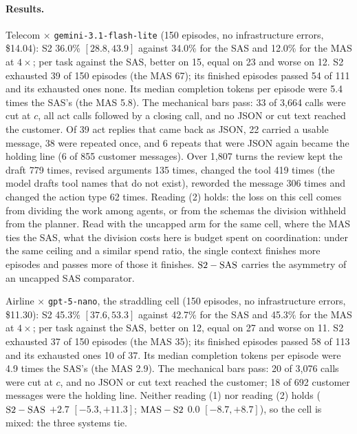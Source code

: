 \paragraph{Results.} Telecom $\times$ \texttt{gemini-3.1-flash-lite} (150 episodes, no infrastructure errors, \$14.04): S2 36.0\% $[28.8, 43.9]$ against 34.0\% for the SAS and 12.0\% for the MAS at $4\times$; per task against the SAS, better on 15, equal on 23 and worse on 12. S2 exhausted 39 of 150 episodes (the MAS 67); its finished episodes passed 54 of 111 and its exhausted ones none. Its median completion tokens per episode were 5.4 times the SAS's (the MAS 5.8). The mechanical bars pass: 33 of 3,664 calls were cut at $c$, all act calls followed by a closing call, and no JSON or cut text reached the customer. Of 39 act replies that came back as JSON, 22 carried a usable message, 38 were repeated once, and 6 repeats that were JSON again became the holding line (6 of 855 customer messages). Over 1,807 turns the review kept the draft 779 times, revised arguments 135 times, changed the tool 419 times (the model drafts tool names that do not exist), reworded the message 306 times and changed the action type 62 times. Reading (2) holds: the loss on this cell comes from dividing the work among agents, or from the schemas the division withheld from the planner. Read with the uncapped arm for the same cell, where the MAS ties the SAS, what the division costs here is budget spent on coordination: under the same ceiling and a similar spend ratio, the single context finishes more episodes and passes more of those it finishes. $\text{S2}-\text{\textup{SAS}}$ carries the asymmetry of an uncapped SAS comparator.

Airline $\times$ \texttt{gpt-5-nano}, the straddling cell (150 episodes, no infrastructure errors, \$11.30): S2 45.3\% $[37.6, 53.3]$ against 42.7\% for the SAS and 45.3\% for the MAS at $4\times$; per task against the SAS, better on 12, equal on 27 and worse on 11. S2 exhausted 37 of 150 episodes (the MAS 35); its finished episodes passed 58 of 113 and its exhausted ones 10 of 37. Its median completion tokens per episode were 4.9 times the SAS's (the MAS 2.9). The mechanical bars pass: 20 of 3,076 calls were cut at $c$, and no JSON or cut text reached the customer; 18 of 692 customer messages were the holding line. Neither reading (1) nor reading (2) holds ($\text{S2}-\text{\textup{SAS}}$ $+2.7$ $[-5.3, +11.3]$; $\text{\textup{MAS}}-\text{S2}$ $0.0$ $[-8.7, +8.7]$), so the cell is mixed: the three systems tie.

